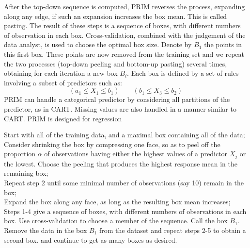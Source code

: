 \documentclass[12pt, letterpaper]{article}
\theoremstyle{definition}
\begin{document}
After the top-down sequence is computed, PRIM reverses the process, expanding along any edge, if such an expansion increases the box mean. This is called pasting. The result of these steps is a sequence of boxes, with different numbers of observation in each box. Cross-validation, combined with the judgement of the data analyst, is used to choose the optimal box size. Denote by $B_1$ the points in this first box. These points are now removed from the training set and we repeat the two processes (top-down peeling and bottom-up pasting) several times, obtaining for each iteration a new box $B_i$. Each box is defined by a set of rules involving a subset of predictors such as:
\begin{equation}
(a_1 \le X_1 \le b_1) \quad\quad (b_1 \le X_3 \le b_2)
\end{equation}
PRIM can handle a categorical predictor by considering all partitions of the predictor, as in CART. Missing values are also handled in a manner similar to CART. PRIM is designed for regression

\begin{algorithm}[!ht]
Start with all of the training data, and a maximal box containing all of the data;\\

Consider shrinking the box by compressing one face, so as to peel off the proportion $\alpha$ of observations having either the highest values of a predictor $X_j$ or the lowest. Choose the peeling that produces the highest response mean in the remaining box;\\

Repeat step 2 until some minimal number of observations (say 10) remain in the box;\\

Expand the box along any face, as long as the resulting box mean increases;\\

Steps 1-4 give a sequence of boxes, with different numbers of observations in each box. Use cross-validation to choose a member of the sequence. Call the box $B_1$.\\

Remove the data in the box $B_1$ from the dataset and repeat steps 2-5 to obtain a second box. and continue to get as many boxes as desired.
\end{algorithm}
\end{document}
